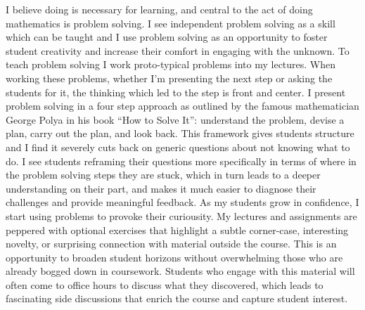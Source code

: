 \documentclass{article}
\begin{document}
I believe doing is necessary for learning, and central to the act of doing mathematics is problem solving. I see independent problem solving as a skill which can be taught and I use problem solving as an opportunity to foster student creativity and increase their comfort in engaging with the unknown. To teach problem solving I work proto-typical problems into my lectures. When working these problems, whether I’m presenting the next step or asking the students for it, the thinking which led to the step is front and center. I present problem solving in a four step approach as outlined by the famous mathematician George Polya in his book “How to Solve It”: understand the problem, devise a plan, carry out the plan, and look back. This framework gives students structure and I find it severely cuts back on generic questions about not knowing what to do.  I see students reframing their questions more specifically in terms of where in the problem solving steps they are stuck, which in turn leads to a deeper understanding on their part, and makes it much easier to diagnose their challenges and provide meaningful feedback. As my students grow in confidence, I start using problems to provoke their curiousity. My lectures and assignments are peppered with optional exercises that highlight a subtle corner-case, interesting novelty, or surprising connection with material outside the course. This is an opportunity to broaden student horizons without overwhelming those who are already bogged down in coursework. Students who engage with this material will often come to office hours to discuss what they discovered, which leads to fascinating side discussions that enrich the course and capture student interest.
\end{document}
